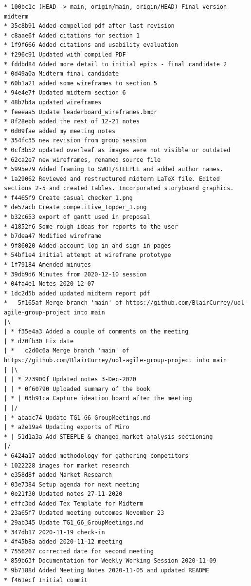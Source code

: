 \begin{verbatim}
* 100bc1c (HEAD -> main, origin/main, origin/HEAD) Final version midterm
* 35c8b91 Added compelled pdf after last revision
* c8aae6f Added citations for section 1
* 1f9f666 Added citations and usability evaluation
* f296c91 Updated with compiled PDF
* fddbd84 Added more detail to initial epics - final candidate 2
* 0d49a0a Midterm final candidate
* 60b1a21 added some wireframes to section 5
* 94e4e7f Updated midterm section 6
* 48b7b4a updated wireframes
* feeeaa5 Update leaderboard_wireframes.bmpr
* 8f28ebb added the rest of 12-21 notes
* 0d09fae added my meeting notes
* 354fc35 new revision from group session
* 0cf3b52 updated overleaf as images were not visible or outdated
* 62ca2e7 new wireframes, renamed source file
* 5995e79 Added framing to SWOT/STEEPLE and added author names.
* 1a29062 Reviewed and restructured midterm LaTeX file. Edited sections 2-5 and created tables. Incorporated storyboard graphics.
* f4465f9 Create casual_checker_1.png
* de57acb Create competitive_topper_1.png
* b32c653 export of gantt used in proposal
* 41852f6 Some rough ideas for reports to the user
* b7dea47 Modified wireframe
* 9f86020 Added account log in and sign in pages
* 54bf1e4 initial attempt at wireframe prototype
* 1f79184 Amended minutes
* 39db9d6 Minutes from 2020-12-10 session
* 04fa4e1 Notes 2020-12-07
* 1dc2d5b added updated midterm report pdf
*   5f165af Merge branch 'main' of https://github.com/BlairCurrey/uol-agile-group-project into main
|\
| * f35e4a3 Added a couple of comments on the meeting
| * d70fb30 Fix date
| *   c2d0c6a Merge branch 'main' of https://github.com/BlairCurrey/uol-agile-group-project into main
| |\
| | * 273900f Updated notes 3-Dec-2020
| | * 0f60790 Uploaded summary of the book
| * | 03b91ca Capture ideation board after the meeting
| |/
| * abaac74 Update TG1_G6_GroupMeetings.md
| * a2e19a4 Updating exports of Miro
* | 51d1a3a Add STEEPLE & changed market analysis sectioning
|/
* 6424a17 added methodology for gathering competitors
* 1022228 images for market research
* e358d8f added Market Research
* 03e7384 Setup agenda for next meeting
* 0e21f30 Updated notes 27-11-2020
* effc3bd Added Tex Template for Midterm
* 23a65f7 Updated meeting outcomes November 23
* 29ab345 Update TG1_G6_GroupMeetings.md
* 347db17 2020-11-19 check-in
* 4f45b8a added 2020-11-12 meeting
* 7556267 corrected date for second meeting
* 859b63f Documentation for Weekly Working Session 2020-11-09
* 9b7188d Added Meeting Notes 2020-11-05 and updated README
* f461ecf Initial commit
\end{verbatim}


